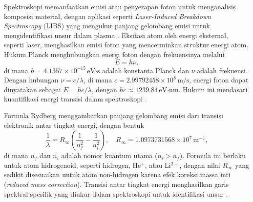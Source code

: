 Spektroskopi memanfaatkan emisi atau penyerapan foton untuk menganalisis komposisi material, dengan aplikasi seperti \textit{Laser-Induced Breakdown Spectroscopy} (LIBS) yang mengukur panjang gelombang emisi untuk mengidentifikasi unsur dalam plasma \citep{CremersRadzemski2013}. Eksitasi atom oleh energi eksternal, seperti laser, menghasilkan emisi foton yang mencerminkan struktur energi atom. Hukum Planck menghubungkan energi foton dengan frekuensinya melalui
\begin{equation}
E = h\nu, \label{eq:planck}
\end{equation}
di mana \( h = 4.1357 \times 10^{-15} \, \text{eV·s} \) adalah konstanta Planck dan \( \nu \) adalah frekuensi. Dengan hubungan \( \nu = c/\lambda \), di mana \( c = 2.99792458 \times 10^8 \, \text{m/s} \), energi foton dapat dinyatakan sebagai \( E = hc/\lambda \), dengan \( hc \approx 1239.84 \, \text{eV·nm} \). Hukum ini mendasari kuantifikasi energi transisi dalam spektroskopi \citep{Beiser1992}.

Formula Rydberg menggambarkan panjang gelombang emisi dari transisi elektronik antar tingkat energi, dengan bentuk
\begin{equation}
\frac{1}{\lambda} = R_\infty \left( \frac{1}{n_f^2} - \frac{1}{n_i^2} \right), \quad R_\infty = 1.0973731568 \times 10^7 \, \text{m}^{-1}, \label{eq:rydberg}
\end{equation}
di mana \( n_f \) dan \( n_i \) adalah nomor kuantum utama (\( n_i > n_f \)). Formula ini berlaku untuk atom hidrogenoid, seperti hidrogen, He\(^+\), atau Li\(^{2+}\), dengan nilai \( R_\infty \) yang sedikit disesuaikan untuk atom non-hidrogen karena efek koreksi massa inti (\textit{reduced mass correction}). Transisi antar tingkat energi menghasilkan garis spektral spesifik yang diukur dalam spektroskopi untuk identifikasi unsur \citep{Griffiths2005}.

